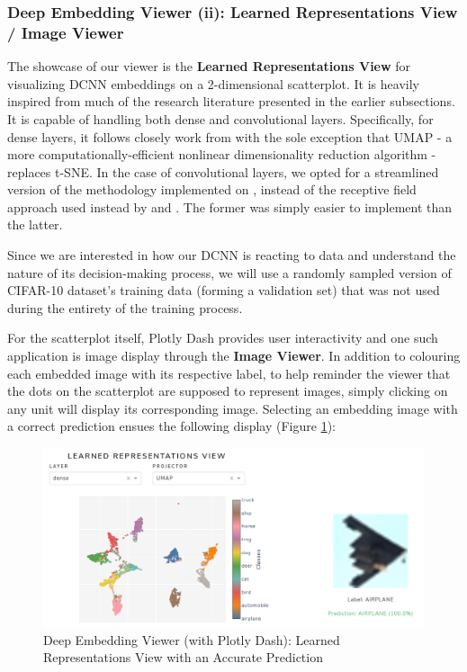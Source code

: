 \newpage


\subsubsection{Deep Embedding Viewer (ii): Learned Representations View / Image Viewer}

The showcase of our viewer is the \textbf{Learned Representations View} for visualizing DCNN embeddings on a 2-dimensional scatterplot. It is heavily inspired from much of the research literature presented in the earlier subsections. It is capable of handling both dense and convolutional layers. Specifically, for dense layers, it follows closely work from \cite{Rauber2017VisualizingTH} with the sole exception that UMAP - a more computationally-efficient nonlinear dimensionality reduction algorithm - replaces t-SNE. In the case of convolutional layers, we opted for a streamlined version of the methodology implemented on \cite{hohman2020summit}, instead of the receptive field approach used instead by \cite{Pezzotti2018DeepEyesPV} and \cite{Carter2019}. The former was simply easier to implement than the latter.

Since we are interested in how our DCNN is reacting to data and understand the nature of its decision-making process, we will use a randomly sampled version of CIFAR-10 dataset's training data (forming a validation set) that was not used during the entirety of the training process.

For the scatterplot itself, Plotly Dash provides user interactivity and one such application is image display through the \textbf{Image Viewer}. In addition to colouring each embedded image with its respective label, to help reminder the viewer that the dots on the scatterplot are supposed to represent images, simply clicking on any unit will display its corresponding image. Selecting an embedding image with a correct prediction ensues the following display (Figure \ref{fig:HRV_016_DEV_Image_Viewer_1}):

\vspace{0.2cm}

\begin{figure}[H]
	\centering
	\includegraphics[scale=0.65]{images/embedding_view/HRV_Fig_016_DEV_Layer_Embedding.PNG}
	\caption{Deep Embedding Viewer (with Plotly Dash): Learned Representations View with an Accurate Prediction}
	\label{fig:HRV_016_DEV_Image_Viewer_1}
\end{figure}

